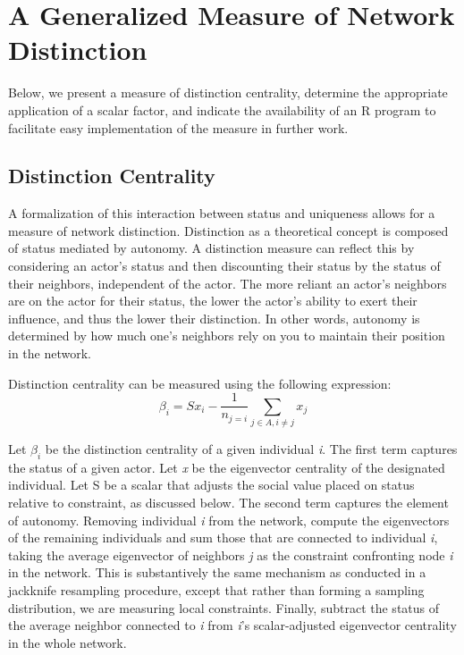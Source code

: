 \documentclass[12pt]{article}
\begin{document}
\section{A Generalized Measure of Network Distinction}
Below, we present a measure of distinction centrality, determine the appropriate application of a scalar factor, and indicate the availability of an R program to facilitate easy implementation of the measure in further work.

\subsection{Distinction Centrality}

A formalization of this interaction between status and uniqueness allows for a measure of network distinction. Distinction as a theoretical concept is composed of status mediated by autonomy. A distinction measure can reflect this by considering an actor's status and then discounting their status by the status of their neighbors, independent of the actor. The more reliant an actor's neighbors are on the actor for their status, the lower the actor's ability to exert their influence, and thus the lower their distinction. In other words, autonomy is determined by how much one's neighbors rely on you to maintain their position in the network. 

Distinction centrality can be measured using the following expression:
\begin{equation}
\beta_i=Sx_i-{\frac{1}{n_{j=i}}\sum_{{j}\in{A},i\neq{j}}x_{j}} 
\end{equation}

Let $\beta_i$ be the distinction centrality of a given individual \textit{i}. The first term captures the status of a given actor. Let \textit{x} be the eigenvector centrality of the designated individual. Let S be a scalar that adjusts the social value placed on status relative to constraint, as discussed below. The second term captures the element of autonomy. Removing individual \textit{i} from the network, compute the eigenvectors of the remaining individuals and sum those that are connected to individual \textit{i}, taking the average eigenvector of neighbors \textit{j} as the constraint confronting node \textit{i} in the network. This is substantively the same mechanism as conducted in a jackknife resampling procedure, except that rather than forming a sampling distribution, we are measuring local constraints. Finally, subtract the status of the average neighbor connected to \textit{i} from \textit{i}’s scalar-adjusted eigenvector centrality in the whole network. 
\end{document}
